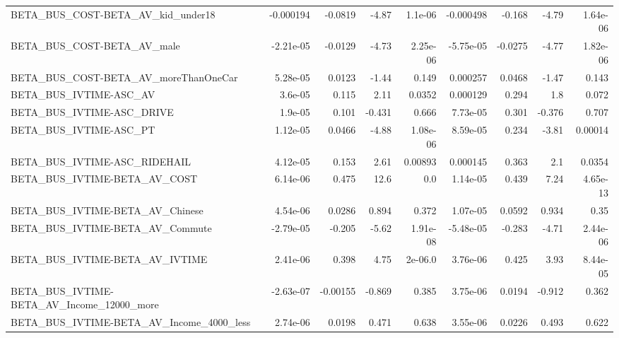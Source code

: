\begin{tabular}{lrrrrrrrr}
BETA\_BUS\_COST-BETA\_AV\_kid\_under18                  &   -0.000194 &      -0.0819 &    -4.87 &  1.1e-06 &  -0.000498 &      -0.168 &        -4.79 &      1.64e-06 \\
BETA\_BUS\_COST-BETA\_AV\_male                         &   -2.21e-05 &      -0.0129 &    -4.73 & 2.25e-06 &  -5.75e-05 &     -0.0275 &        -4.77 &      1.82e-06 \\
BETA\_BUS\_COST-BETA\_AV\_moreThanOneCar               &    5.28e-05 &       0.0123 &    -1.44 &    0.149 &   0.000257 &      0.0468 &        -1.47 &         0.143 \\
BETA\_BUS\_IVTIME-ASC\_AV                             &     3.6e-05 &        0.115 &     2.11 &   0.0352 &   0.000129 &       0.294 &          1.8 &         0.072 \\
BETA\_BUS\_IVTIME-ASC\_DRIVE                          &     1.9e-05 &        0.101 &   -0.431 &    0.666 &   7.73e-05 &       0.301 &       -0.376 &         0.707 \\
BETA\_BUS\_IVTIME-ASC\_PT                             &    1.12e-05 &       0.0466 &    -4.88 & 1.08e-06 &   8.59e-05 &       0.234 &        -3.81 &       0.00014 \\
BETA\_BUS\_IVTIME-ASC\_RIDEHAIL                       &    4.12e-05 &        0.153 &     2.61 &  0.00893 &   0.000145 &       0.363 &          2.1 &        0.0354 \\
BETA\_BUS\_IVTIME-BETA\_AV\_COST                       &    6.14e-06 &        0.475 &     12.6 &      0.0 &   1.14e-05 &       0.439 &         7.24 &      4.65e-13 \\
BETA\_BUS\_IVTIME-BETA\_AV\_Chinese                    &    4.54e-06 &       0.0286 &    0.894 &    0.372 &   1.07e-05 &      0.0592 &        0.934 &          0.35 \\
BETA\_BUS\_IVTIME-BETA\_AV\_Commute                    &   -2.79e-05 &       -0.205 &    -5.62 & 1.91e-08 &  -5.48e-05 &      -0.283 &        -4.71 &      2.44e-06 \\
BETA\_BUS\_IVTIME-BETA\_AV\_IVTIME                     &    2.41e-06 &        0.398 &     4.75 &  2e-06.0 &   3.76e-06 &       0.425 &         3.93 &      8.44e-05 \\
BETA\_BUS\_IVTIME-BETA\_AV\_Income\_12000\_more          &   -2.63e-07 &     -0.00155 &   -0.869 &    0.385 &   3.75e-06 &      0.0194 &       -0.912 &         0.362 \\
BETA\_BUS\_IVTIME-BETA\_AV\_Income\_4000\_less           &    2.74e-06 &       0.0198 &    0.471 &    0.638 &   3.55e-06 &      0.0226 &        0.493 &         0.622 \\

\end{tabular}
